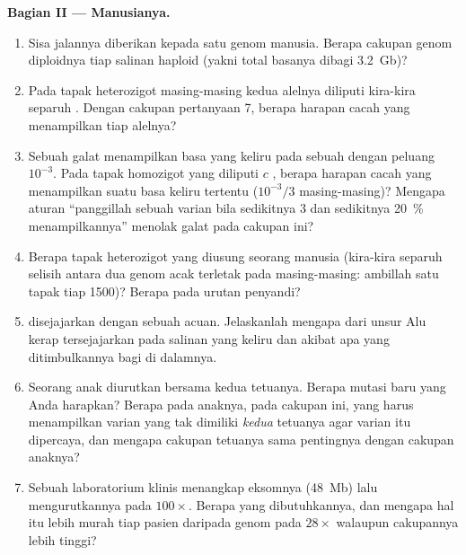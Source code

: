 \begin{problem}
\medskip
\noindent\textbf{Bagian II --- Manusianya.}
\begin{enumerate}[resume]
  \item Sisa jalannya diberikan kepada satu genom manusia. Berapa cakupan
        genom diploidnya tiap salinan haploid (yakni total basanya dibagi
        \qty{3.2}{Gb})?
  \item Pada tapak heterozigot masing-masing kedua alelnya diliputi
        kira-kira separuh . Dengan cakupan pertanyaan 7, berapa
        harapan cacah  yang menampilkan tiap alelnya?
  \item Sebuah galat menampilkan basa yang keliru pada sebuah  dengan
        peluang $10^{-3}$. Pada tapak homozigot yang diliputi $c$ ,
        berapa harapan cacah  yang menampilkan suatu basa keliru
        tertentu ($10^{-3}/3$ masing-masing)? Mengapa aturan ``panggillah
        sebuah varian bila sedikitnya $3$  dan sedikitnya \qty{20}{\%}
         menampilkannya'' menolak galat pada cakupan ini?
  \item Berapa tapak heterozigot yang diusung seorang manusia (kira-kira
        separuh selisih antara dua genom acak terletak pada masing-masing:
        ambillah satu tapak tiap \num{1500})? Berapa pada urutan penyandi?
  \item {} disejajarkan dengan sebuah acuan. Jelaskanlah mengapa
         dari unsur Alu kerap tersejajarkan pada salinan yang keliru
        dan akibat apa yang ditimbulkannya bagi  di
        dalamnya.
  \item Seorang anak diurutkan bersama kedua tetuanya. Berapa mutasi baru
        yang Anda harapkan? Berapa  pada anaknya, pada cakupan ini,
        yang harus menampilkan varian yang tak dimiliki \emph{kedua}
        tetuanya agar varian itu dipercaya, dan mengapa cakupan tetuanya
        sama pentingnya dengan cakupan anaknya?
  \item Sebuah laboratorium klinis menangkap eksomnya (\qty{48}{Mb}) lalu
        mengurutkannya pada $100\times$. Berapa  yang dibutuhkannya, dan
        mengapa hal itu lebih murah tiap pasien daripada genom pada $28\times$
        walaupun cakupannya lebih tinggi?
\end{enumerate}


\end{problem}
